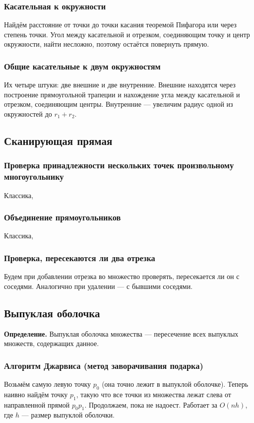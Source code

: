 \subsubsection{Касательная к окружности}
Найдём расстояние от точки до точки касания теоремой Пифагора или через степень точки.
Угол между касательной и отрезком, соединяющим точку и центр окружности, найти несложно, поэтому остаётся повернуть прямую.

\subsubsection{Общие касательные к двум окружностям}
Их четыре штуки: две внешние и две внутренние.
Внешние находятся через построение прямоугольной трапеции и нахождение угла между касательной и отрезком, соединяющим центры.
Внутренние --- увеличим радиус одной из окружностей до $r_1 + r_2$.

\subsection{Сканирующая прямая}
\subsubsection{Проверка принадлежности нескольких точек произвольному многоугольнику}
Классика,

\subsubsection{Объединение прямоугольников}
Классика,

\subsubsection{Проверка, пересекаются ли два отрезка}
Будем при добавлении отрезка во множество проверять, пересекается ли он с соседями.
Аналогично при удалении --- с бывшими соседями.

\subsection{Выпуклая оболочка}
\textbf{Определение.} Выпуклая оболочка множества --- пересечение всех выпуклых множеств, содержащих данное.

\subsubsection{Алгоритм Джарвиса (метод заворачивания подарка)}
Возьмём самую левую точку $p_0$ (она точно лежит в выпуклой оболочке).
Теперь наивно найдём точку $p_1$, такую что все точки из множества лежат слева от направленной прямой $p_0 p_1$.
Продолжаем, пока не надоест.
Работает за $O(nh)$, где $h$ --- размер выпуклой оболочки.

